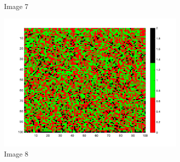 \documentclass[unicode,11pt,a4paper,oneside,numbers=endperiod,openany]{scrartcl}
\begin{document}
\begin{figure}[H]
      \begin{subfigure}[b]{0.3\textwidth}
        \caption{Image 7}
        \label{fig:image7}
      \end{subfigure}
      \begin{subfigure}[b]{0.3\textwidth}
        \includegraphics[width=\textwidth]{results/iterations_1002_H_8_random_1.png}
        \caption{Image 8}
        \label{fig:image8}
      \end{subfigure}
      \begin{subfigure}[b]{0.3\textwidth}

\end{subfigure}
\end{figure}
\end{document}
